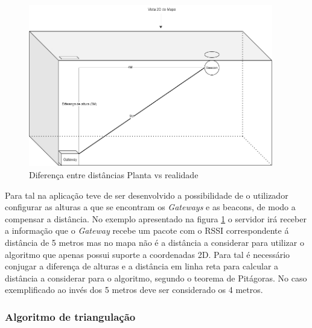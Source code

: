 \begin{figure}[ht]
\centering
\includegraphics[width=0.95\textwidth]{images/disr.png}
\caption{Diferença entre distâncias Planta vs realidade}\label{altura1}
\end{figure}


\par Para tal na aplicação teve de ser desenvolvido a possibilidade de o utilizador configurar as alturas a que se encontram os \textit{Gateways} e as beacons, de modo a compensar a distância. No exemplo apresentado na figura \ref{altura1} o servidor irá receber a informação que o \textit{Gateway} recebe um pacote com o RSSI correspondente á distância de 5 metros mas no mapa não é a distância a considerar para utilizar o algoritmo que apenas possui suporte a coordenadas 2D. Para tal é necessário conjugar a diferença de alturas e a distância em linha reta para calcular a distância a considerar para o algoritmo, segundo o teorema de Pitágoras. No caso exemplificado ao invés dos 5 metros deve ser considerado os 4 metros.

\subsubsection{Algoritmo de triangulação}


